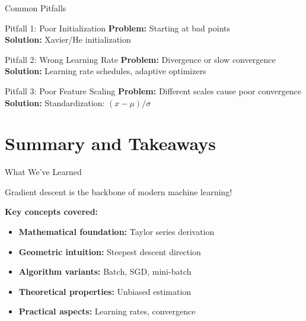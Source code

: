 \documentclass[usenames,dvipsnames]{beamer}
\begin{document}
  \begin{frame}{Common Pitfalls}
    \begin{alertbox}{Pitfall 1: Poor Initialization}
    \textbf{Problem:} Starting at bad points
    \\\textbf{Solution:} Xavier/He initialization
    \end{alertbox}
    
    \pause
    \begin{alertbox}{Pitfall 2: Wrong Learning Rate}
    \textbf{Problem:} Divergence or slow convergence
    \\\textbf{Solution:} Learning rate schedules, adaptive optimizers
    \end{alertbox}
    
    \pause
    \begin{alertbox}{Pitfall 3: Poor Feature Scaling}
    \textbf{Problem:} Different scales cause poor convergence
    \\\textbf{Solution:} Standardization: $(x - \mu)/\sigma$
    \end{alertbox}
  \end{frame}

  \section{Summary and Takeaways}

  \begin{frame}{What We've Learned}
    \begin{keypointsbox}
    Gradient descent is the backbone of modern machine learning!
    \end{keypointsbox}
    
    \pause
    \textbf{Key concepts covered:}
    \begin{itemize}[<+->]
        \item \textbf{Mathematical foundation:} Taylor series derivation
        \item \textbf{Geometric intuition:} Steepest descent direction
        \item \textbf{Algorithm variants:} Batch, SGD, mini-batch
        \item \textbf{Theoretical properties:} Unbiased estimation
        \item \textbf{Practical aspects:} Learning rates, convergence
    \end{itemize}
  \end{frame}
\end{document}
